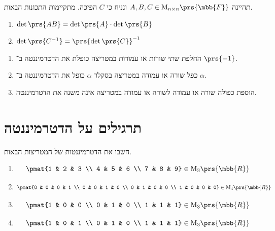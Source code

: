\documentclass[a4paper,10pt,twoside,openany]{book}
\renewcommand{\Mat}{\mathrm{M}}
\begin{document}
\begin{theorem}
תהיינה
$A, B, C \in \Mat_{n \times n}\prs{\mbb{F}}$
ונניח כי
$C$
הפיכה.
מתקיימות התכונות הבאות.
\begin{enumerate}
\item $\det\prs{AB} = \det\prs{A} \cdot \det\prs{B}$
\item $\det\prs{C^{-1}} = \prs{\det\prs{C}}^{-1}$
\end{enumerate}
\end{theorem}

\begin{theorem}
\begin{enumerate}
\item החלפת שתי שורות או עמודות במטריצה כופלת את הדטרמיננטה ב־%
$\prs{-1}$.
\item כפל שורה או עמודה במטריצה בסקלר
$\alpha$
כופל את הדטרמיננטה ב־%
$\alpha$.
\item הוספת כפולה שורה או עמודה לשורה או עמודה במטריצה אינה משנה את הדטרמיננטה.
\end{enumerate}
\end{theorem}

\section{תרגילים על הדטרמיננטה}

\begin{exercisechap}
חשבו את הדטרמיננטות של המטריצות הבאות.

\begin{enumerate}
\item \[\pmat{1 & 2 & 3 \\ 4 & 5 & 6 \\ 7 & 8 & 9} \in \Mat_{3}\prs{\mbb{R}}\]
\item \[\pmat{0 & 0 & 0 & 1 \\ 0 & 0 & 1 & 0 \\ 0 & 1 & 0 & 0 \\ 1 & 0 & 0 & 0} \in \Mat_{4}\prs{\mbb{R}}\]
\item \[\pmat{1 & 0 & 0 \\ 0 & 1 & 0 \\ 1 & 1 & 1} \in \Mat_{3}\prs{\mbb{R}}\]
\item \[\pmat{1 & 0 & 1 \\ 0 & 1 & 0 \\ 1 & 1 & 1} \in \Mat_{3}\prs{\mbb{R}}\]
\end{enumerate}
\end{exercisechap}
\end{document}
